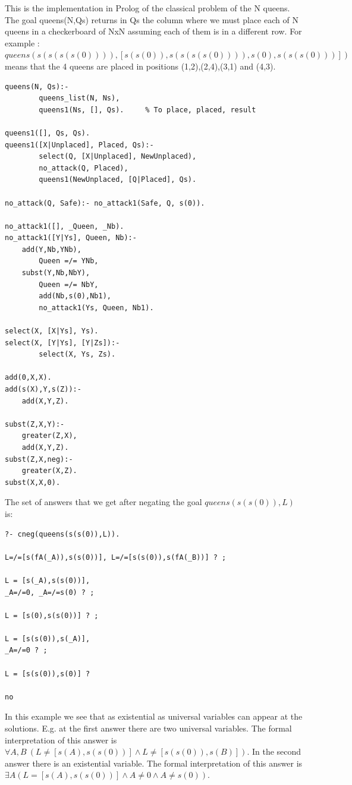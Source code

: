 \documentclass{tlp}
\begin{document}
This is the implementation in Prolog of the classical problem of the N
queens. The goal queens(N,Qs) returns in Qs the column where we must place
each of N queens in a checkerboard of NxN assuming each of them is in a
different row. For example :
$queens(s(s(s(s(0)))),[s(s(0)),s(s(s(s(0)))),s(0),s(s(s(0)))])$ means that the
4 queens are placed in positions (1,2),(2,4),(3,1) and (4,3).

\begin{small}
\begin{verbatim}
queens(N, Qs):-
        queens_list(N, Ns),
        queens1(Ns, [], Qs).     % To place, placed, result

queens1([], Qs, Qs).
queens1([X|Unplaced], Placed, Qs):-
        select(Q, [X|Unplaced], NewUnplaced),
        no_attack(Q, Placed),
        queens1(NewUnplaced, [Q|Placed], Qs).
 
no_attack(Q, Safe):- no_attack1(Safe, Q, s(0)). 
 
no_attack1([], _Queen, _Nb).
no_attack1([Y|Ys], Queen, Nb):-
	add(Y,Nb,YNb),
        Queen =/= YNb,
 	subst(Y,Nb,NbY),
        Queen =/= NbY,
        add(Nb,s(0),Nb1),
        no_attack1(Ys, Queen, Nb1).

select(X, [X|Ys], Ys).
select(X, [Y|Ys], [Y|Zs]):-
        select(X, Ys, Zs).

add(0,X,X).
add(s(X),Y,s(Z)):-
	add(X,Y,Z).

subst(Z,X,Y):-
	greater(Z,X),
	add(X,Y,Z).
subst(Z,X,neg):-
	greater(X,Z).
subst(X,X,0).
\end{verbatim}
\end{small}

The set of answers that we get after negating the goal $queens(s(s(0)),L)$ is:
\begin{small}
\begin{verbatim}
?- cneg(queens(s(s(0)),L)).

L=/=[s(fA(_A)),s(s(0))], L=/=[s(s(0)),s(fA(_B))] ? ;

L = [s(_A),s(s(0))],
_A=/=0, _A=/=s(0) ? ;

L = [s(0),s(s(0))] ? ;

L = [s(s(0)),s(_A)],
_A=/=0 ? ;

L = [s(s(0)),s(0)] ? 

no
\end{verbatim}
\end{small}

In this example we see that as existential as universal variables can
appear at the solutions. E.g. at the first answer there are two
universal variables. The formal interpretation of this answer is
$\forall A,B~ (L \neq [s(A),s(s(0))] \wedge L \neq
[s(s(0)),s(B)])$. In the second answer there is an existential
variable. The formal interpretation of this answer is $ \exists A
(L=[s(A),s(s(0))] \wedge A \neq 0 \wedge A \neq s(0))$.
 
\end{document}
